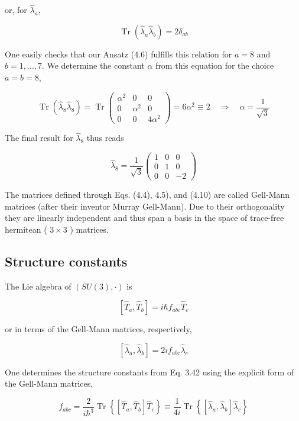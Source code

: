 \documentclass[10pt, letterpaper]{article}
\begin{document}
or, for $\hat{\lambda}_{a}$,

$$
\operatorname{Tr}\left(\hat{\lambda}_{a} \hat{\lambda}_{b}\right)=2 \delta_{a b}
$$

One easily checks that our Ansatz (4.6) fulfills this relation for $a=8$ and $b=1, \ldots, 7$. We determine the constant $\alpha$ from this equation for the choice $a=b=8$,

$$
\operatorname{Tr}\left(\hat{\lambda}_{8} \hat{\lambda}_{8}\right)=\operatorname{Tr}\left(\begin{array}{ccc}
\alpha^{2} & 0 & 0 \\
0 & \alpha^{2} & 0 \\
0 & 0 & 4 \alpha^{2}
\end{array}\right)=6 \alpha^{2} \equiv 2 \quad \Longrightarrow \quad \alpha=\frac{1}{\sqrt{3}}
$$

The final result for $\hat{\lambda}_{8}$ thus reads

$$
\hat{\lambda}_{8}=\frac{1}{\sqrt{3}}\left(\begin{array}{ccc}
1 & 0 & 0 \\
0 & 1 & 0 \\
0 & 0 & -2
\end{array}\right)
$$

The matrices defined through Eqs. (4.4), 4.5), and (4.10) are called Gell-Mann matrices (after their inventor Murray Gell-Mann). Due to their orthogonality they are linearly independent and thus span a basis in the space of trace-free hermitean ( $3 \times 3$ ) matrices.

\subsection{Structure constants}
The Lie algebra of $(S U(3), \cdot)$ is

$$
\left[\hat{T}_{a}, \hat{T}_{b}\right]=i \hbar f_{a b c} \hat{T}_{c}
$$

or in terms of the Gell-Mann matrices, respectively,

$$
\left[\hat{\lambda}_{a}, \hat{\lambda}_{b}\right]=2 i f_{a b c} \hat{\lambda}_{c}
$$

One determines the structure constants from Eq. 3.42 using the explicit form of the Gell-Mann matrices,

$$
f_{a b c}=\frac{2}{i \hbar^{3}} \operatorname{Tr}\left\{\left[\hat{T}_{a}, \hat{T}_{b}\right] \hat{T}_{c}\right\} \equiv \frac{1}{4 i} \operatorname{Tr}\left\{\left[\hat{\lambda}_{a}, \hat{\lambda}_{b}\right] \hat{\lambda}_{c}\right\}
$$
\end{document}
